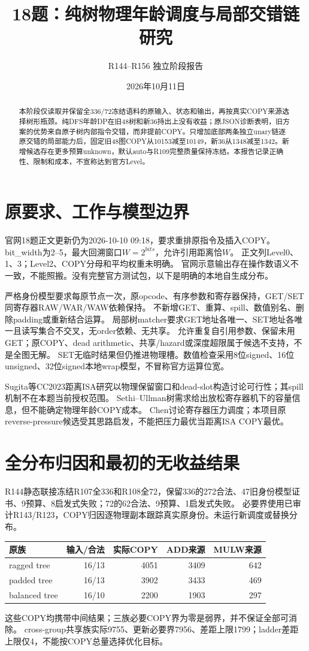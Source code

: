 \documentclass[UTF8,11pt,a4paper]{ctexart}
\title{18题：纯树物理年龄调度与局部交错链研究}
\author{R144--R156 独立阶段报告}
\date{2026年10月11日}
\begin{document}
\maketitle
\begin{abstract}
本阶段仅读取并保留全336/72冻结语料的原输入、状态和输出，再按真实COPY来源选择树形瓶颈。纯DFS年龄DP在旧48树和新36持出上没有收益；原JSON诊断表明，旧方案的优势来自原子树内部指令交错，而非提前COPY。只增加底部两条独立unary链逐原交错的局部能力后，固定旧48图COPY从10153减至10149，新36从1348减至1342。新增候选存在更多预算unknown，默认auto与R109完整质量保持冻结。本报告记录正确性、限制和成本，不宣称达到官方Level。
\end{abstract}

\section{原要求、工作与模型边界}
官网18题正文更新仍为2026-10-10 09:18，要求重排原指令及插入COPY。
bit\_width为2--5，最大回溯窗口$W=2^{bits}$，允许引用距离恰$W$。
正文列Level0、1、3；Level2、COPY分母和平均权重未明确。
官网示意输出存在操作数语义不一致，不能照搬。没有完整官方测试包，以下是明确的本地自生成分布。

严格身份模型要求每原节点一次，原opcode、有序参数和寄存器保持，GET/SET同寄存器RAW/WAR/WAW依赖保持。
不新增GET、重算、spill、数值别名、删除padding或重新结合运算。
局部树matcher要求GET地址各唯一、SET地址各唯一且读写集合不交叉，无order依赖、无共享。
允许重复自引用参数、保留未用GET；原COPY、dead arithmetic、共享/hazard或深度超限属于候选不支持，不是全图无解。
SET无临时结果但仍推进物理槽。数值检查采用8位signed、16位unsigned、32位signed本地wrap模型，不冒称官方运算位宽。

Sugita等CC2023距离ISA研究以物理保留窗口和dead-slot构造讨论可行性；其spill机制不在本题当前授权范围\cite{sugita}。
Sethi--Ullman树需求给出放松寄存器机下的容量信息，但不能确定物理年龄COPY成本\cite{sethi}。
Chen讨论寄存器压力调度；本项目原reverse-pressure候选受其思路启发，不能把压力最优当距离ISA COPY最优\cite{chen}。

\section{全分布归因和最初的无收益结果}
R144静态联接冻结R107全336和R108全72，保留336的272合法、47旧身份模型证书、9预算、8启发式失败；72的62合法、9预算、1启发式失败。
必要界使用已审计R143/R123，COPY归因逐物理副本跟踪真实原身份。未运行新调度或替换分布。

\begin{center}\small
\begin{tabular}{lrrrr}
\toprule
原族&输入/合法&实际COPY&ADD来源&MULW来源\\
\midrule
ragged tree&16/13&4051&3409&642\\
padded tree&16/13&3902&3433&469\\
balanced tree&16/10&2200&1903&297\\
\bottomrule
\end{tabular}
\end{center}
这些COPY均携带中间结果；三族必要COPY界为零是弱界，并不保证全部可消除。
cross-group共享族实际9755、更新必要界7956、差距上限1799；ladder差距上限仅4，不能按COPY总量选择优化目标。
\end{document}
